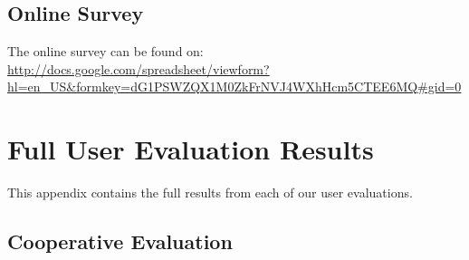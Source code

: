\documentclass[11pt,twocolumn]{article}
\begin{document}
\subsection{Online Survey}

The online survey can be found on:\\ \url{http://docs.google.com/spreadsheet/viewform?hl=en_US&formkey=dG1PSWZQX1M0ZkFrNVJ4WXhHcm5CTEE6MQ#gid=0}

\newpage
\section{Full User Evaluation Results}

This appendix contains the full results from each of our user evaluations.

\subsection{Cooperative Evaluation}
\end{document}
